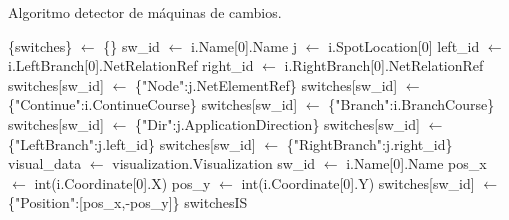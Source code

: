     \begin{algorithm}
            \caption{Algoritmo detector de máquinas de cambios.}
            \label{alg:switches}
            \begin{algorithmic}
                \STATE \{switches\} $\gets$ \{\}
                            \STATE sw\_id $\gets$ i.Name[0].Name
                            \STATE j $\gets$ i.SpotLocation[0]
                            \STATE left\_id $\gets$ i.LeftBranch[0].NetRelationRef
                            \STATE right\_id $\gets$ i.RightBranch[0].NetRelationRef
                            \STATE switches[sw\_id] $\gets$ \{"Node":j.NetElementRef\}
                            \STATE switches[sw\_id] $\gets$ \{"Continue":i.ContinueCourse\}
                            \STATE switches[sw\_id] $\gets$ \{"Branch":i.BranchCourse\}
                            \STATE switches[sw\_id] $\gets$ \{"Dir":j.ApplicationDirection\}
                            \STATE switches[sw\_id] $\gets$ \{"LeftBranch":j.left\_id\}
                            \STATE switches[sw\_id] $\gets$ \{"RightBranch":j.right\_id\}
                        \ENDIF
                    \ENDFOR
                \ENDIF
                \STATE visual\_data $\gets$ visualization.Visualization
                        \STATE sw\_id $\gets$ i.Name[0].Name
                            \STATE pos\_x $\gets$ int(i.Coordinate[0].X)
                            \STATE pos\_y $\gets$ int(i.Coordinate[0].Y)
                            \STATE switches[sw\_id] $\gets$ \{"Position":[pos\_x,-pos\_y]\}
                        \ENDIF 
                    \ENDFOR
                \ENDIF
            \OUTPUT switchesIS
            \end{algorithmic}
        \end{algorithm}